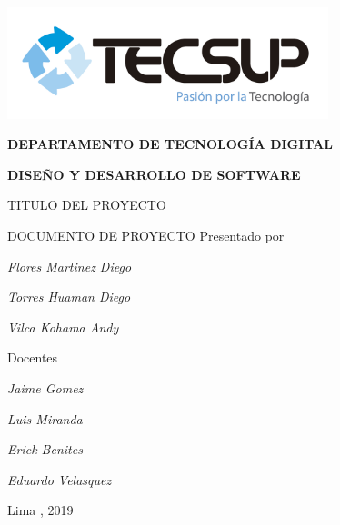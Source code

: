 \begin{titlepage}
	\centering
	\includegraphics[width=0.70\textwidth]{img/logo_tecsup_final}\par\vspace{1cm}
	\vspace{0.30cm}	
	{\scshape\large\bfseries DEPARTAMENTO DE TECNOLOG\'IA DIGITAL \par}
	\vspace{0.60cm}	
	{\scshape\large\bfseries DISEÑO Y DESARROLLO DE SOFTWARE  \par}
	\vspace{2.00cm}		
	{\large\large TITULO DEL PROYECTO \par}
	\vspace{0.60cm}
	{\scshape\large DOCUMENTO DE PROYECTO }
	\vspace{0.60cm}
	\vfill
	Presentado por \par
	{\large\itshape {Flores Martinez Diego}\par}
	{\large\itshape {Torres Huaman Diego}\par}
	{\large\itshape {Vilca Kohama Andy}\par}
	\vspace{0.30cm}
	\vfill
	Docentes \par
	{\large\itshape {Jaime Gomez}}\par
	{\large\itshape {Luis Miranda}}\par
	{\large\itshape {Erick Benites}}\par
	{\large\itshape {Eduardo Velasquez}}\par
	\vspace{0.30cm}
	\vfill
	{\large Lima , 2019 \par}
\end{titlepage}

